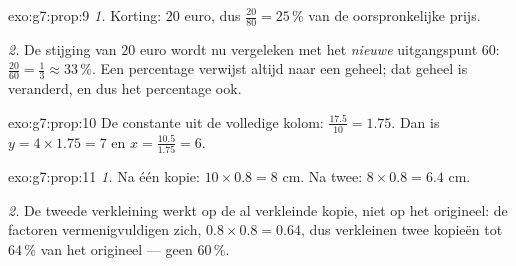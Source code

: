 \begin{solution}{exo:g7:prop:9}
\emph{1.} Korting: $20$ euro, dus $\frac{20}{80} = 25\,\%$ van de oorspronkelijke
prijs.

\emph{2.} De stijging van $20$ euro wordt nu vergeleken met het \emph{nieuwe}
uitgangspunt $60$: $\frac{20}{60} = \frac13 \approx 33\,\%$. Een percentage
verwijst altijd naar een geheel; dat geheel is veranderd, en dus het percentage
ook.
\end{solution}

\begin{solution}{exo:g7:prop:10}
De constante uit de volledige kolom: $\frac{17.5}{10} = 1.75$. Dan is
$y = 4 \times 1.75 = 7$ en $x = \frac{10.5}{1.75} = 6$.
\end{solution}

\begin{solution}{exo:g7:prop:11}
\emph{1.} Na één kopie: $10 \times 0.8 = 8$ cm. Na twee: $8 \times 0.8 = 6.4$ cm.

\emph{2.} De tweede verkleining werkt op de al verkleinde kopie, niet op het
origineel: de factoren vermenigvuldigen zich, $0.8 \times 0.8 = 0.64$, dus
verkleinen twee kopieën tot $64\,\%$ van het origineel --- geen $60\,\%$.
\end{solution}

